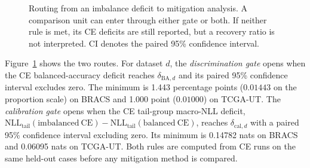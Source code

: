 \documentclass[11pt]{article}
\begin{document}
\begin{figure}[H]
  \centering
  \caption{Routing from an imbalance deficit to mitigation analysis. A comparison unit can enter through either gate or both. If neither rule is met, its CE deficits are still reported, but a recovery ratio is not interpreted. CI denotes the paired 95\% confidence interval.}
  \label{fig:gate-routing}
\end{figure}

Figure~\ref{fig:gate-routing} shows the two routes. For dataset $d$, the \emph{discrimination gate} opens when the CE balanced-accuracy deficit reaches $\delta_{\mathrm{BA},d}$ and its paired 95\% confidence interval excludes zero. The minimum is \num{1.443} percentage points ($\num{0.01443}$ on the proportion scale) on BRACS and \num{1.000} point ($\num{0.01000}$) on TCGA-UT. The \emph{calibration gate} opens when the CE tail-group macro-NLL deficit, $\mathrm{NLL}_{\mathrm{tail}}(\mathrm{imbalanced\ CE})-\mathrm{NLL}_{\mathrm{tail}}(\mathrm{balanced\ CE})$, reaches $\delta_{\mathrm{cal},d}$ with a paired 95\% confidence interval excluding zero. Its minimum is \num{0.14782} nats on BRACS and \num{0.06095} nats on TCGA-UT. Both rules are computed from CE runs on the same held-out cases before any mitigation method is compared.
\end{document}

